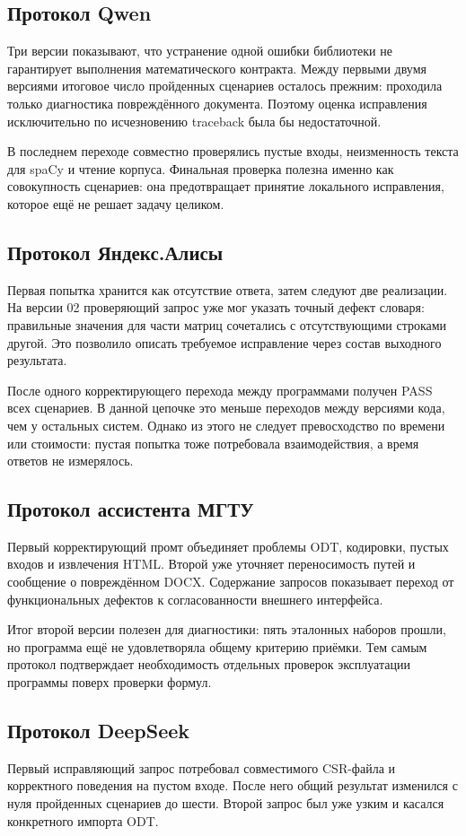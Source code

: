 \subsection{Протокол Qwen}
Три версии показывают, что устранение одной ошибки библиотеки не гарантирует выполнения математического контракта. Между первыми двумя версиями итоговое число пройденных сценариев осталось прежним: проходила только диагностика повреждённого документа. Поэтому оценка исправления исключительно по исчезновению traceback была бы недостаточной.

В последнем переходе совместно проверялись пустые входы, неизменность текста для spaCy и чтение корпуса. Финальная проверка полезна именно как совокупность сценариев: она предотвращает принятие локального исправления, которое ещё не решает задачу целиком.

\subsection{Протокол Яндекс.Алисы}
Первая попытка хранится как отсутствие ответа, затем следуют две реализации. На версии 02 проверяющий запрос уже мог указать точный дефект словаря: правильные значения для части матриц сочетались с отсутствующими строками другой. Это позволило описать требуемое исправление через состав выходного результата.

После одного корректирующего перехода между программами получен PASS всех сценариев. В данной цепочке это меньше переходов между версиями кода, чем у остальных систем. Однако из этого не следует превосходство по времени или стоимости: пустая попытка тоже потребовала взаимодействия, а время ответов не измерялось.

\subsection{Протокол ассистента МГТУ}
Первый корректирующий промт объединяет проблемы ODT, кодировки, пустых входов и извлечения HTML. Второй уже уточняет переносимость путей и сообщение о повреждённом DOCX. Содержание запросов показывает переход от функциональных дефектов к согласованности внешнего интерфейса.

Итог второй версии полезен для диагностики: пять эталонных наборов прошли, но программа ещё не удовлетворяла общему критерию приёмки. Тем самым протокол подтверждает необходимость отдельных проверок эксплуатации программы поверх проверки формул.

\subsection{Протокол DeepSeek}
Первый исправляющий запрос потребовал совместимого CSR-файла и корректного поведения на пустом входе. После него общий результат изменился с нуля пройденных сценариев до шести. Второй запрос был уже узким и касался конкретного импорта ODT.

